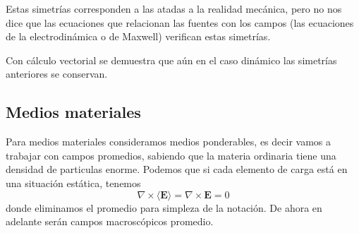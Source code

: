 ﻿\documentclass{article}
\numberwithin{equation}{section} %
\renewcommand{\vec}[1]{\boldsymbol{#1}}
\begin{document}
Estas simetrías corresponden a las atadas a la realidad mecánica, pero no nos dice que las ecuaciones que relacionan las fuentes con los campos (las ecuaciones de la electrodinámica o de Maxwell) verifican estas simetrías. 

Con cálculo vectorial se demuestra que aún en el caso dinámico las simetrías anteriores se conservan.
 \subsection{Medios materiales}
Para medios materiales consideramos medios ponderables, es decir vamos a trabajar con campos promedios, sabiendo que la materia ordinaria tiene una densidad de particulas enorme.
Podemos que si cada elemento de carga está en una situación estática, tenemos
\begin{equation}
\nabla \times \langle \vec{E} \rangle = \nabla \times \vec{E} = 0
\end{equation}
donde eliminamos el promedio para simpleza de la notación. De ahora en adelante serán campos macroscópicos promedio.
\end{document}
